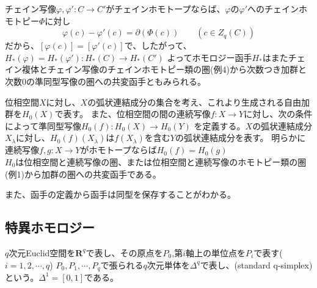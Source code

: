 \documentclass[dvipdfmx,a4paper,11pt]{jsarticle}
\begin{document}
\begin{tcolorbox}[title = 例6]
  チェイン写像$\varphi,\varphi' : C\to C'$がチェインホモトープならば、$\varphi$の$\varphi'$へのチェインホモトピー$\Phi$に対し
  \begin{equation*}
    \varphi(c)-\varphi'(c)=\partial(\Phi(c))\qquad (c\in Z_{q}(C))
  \end{equation*}
  だから、$[\varphi(c)]=[\varphi'(c)]$で、したがって、$H_{*}(\varphi)=H_{*}(\varphi'):H_{*}(C)\to H_{*}(C')$
  よってホモロジー函手$H_{*}$はまたチェイン複体とチェイン写像のチェインホモトピー類の圏(例4)から次数つき加群と次数$0$の準同型写像の圏への共変函手ともみられる。
\end{tcolorbox}

\begin{tcolorbox}[title = 例7]
  位相空間$X$に対し、$X$の弧状連結成分の集合を考え、これより生成される自由加群を$H_{0}(X)$で表す。
  また、位相空間の間の連続写像$f:X\to Y$に対し、次の条件によって準同型写像$H_{0}(f):H_{0}(X)\to H_{0}(Y)$
  を定義する。$X$の弧状連結成分$X_{\lambda}$に対し、$H_{0}(f)(X_{\lambda})$は$f(X_{\lambda})$を含む$Y$の弧状連結成分を表す。
  明らかに連続写像$f,g:X\to Y$がホモトープならば$H_{0}(f)=H_{0}(g)$\\
  $H_{0}$は位相空間と連続写像の圏、または位相空間と連続写像のホモトピー類の圏(例1)から加群の圏への共変函手である。
\end{tcolorbox}
また、函手の定義から函手は同型を保存することがわかる。

\clearpage

\subsection{特異ホモロジー}
$q$次元Euclid空間を$\mathbf{R}^q$で表し、その原点を$P_0$,第$i$軸上の単位点を$P_i$で表す($i=1,2,\cdots,q$)
$P_{0},P_{1},\cdots,P_{q}$で張られる$q$次元単体を$\Delta^q$で表し、(standard q-simplex)という。$\Delta^1=[0,1]$である。
\end{document}
